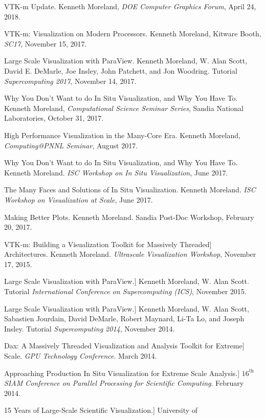 \documentclass{article}
\begin{document}
\begin{enumerate}[label={[\arabic*]}]
\item VTK-m Update.
  Kenneth Moreland, \emph{DOE Computer Graphics Forum}, April 24, 2018.
\item VTK-m: Visualization on Modern Processors.
  Kenneth Moreland, Kitware Booth, \emph{SC17}, November 15, 2017.
\item Large Scale Visualization with ParaView.
  Kenneth Moreland, W. Alan Scott, David E. DeMarle, Joe Insley, John Patchett, and Jon Woodring.
  Tutorial \emph{Supercomputing 2017}, November 14, 2017.
\item Why You Don't Want to do In Situ Visualization, and Why You Have To.
  Kenneth Moreland, \emph{Computational Science Seminar Series}, Sandia National Laboratories, October 31, 2017.
\item High Performance Visualization in the Many-Core Era.
  Kenneth Moreland, \emph{Computing@PNNL Seminar}, August 2017.
\item Why You Don't Want to do In Situ Visualization, and Why You Have To.
  Kenneth Moreland.
  \emph{ISC Workshop on In Situ Visualization}, June 2017.
\item The Many Faces and Solutions of In Situ Visualization.
  Kenneth Moreland.
  \emph{ISC Workshop on Visualization at Scale}, June 2017.
\item Making Better Plots.
  Kenneth Moreland.
  Sandia Post-Doc Workshop, February 20, 2017.
\item VTK-m: Building a Visualization Toolkit for Massively Threaded]~\\ Architectures.
  Kenneth Moreland.
  \emph{Ultrascale Visualization Workshop}, November 17, 2015.
\item Large Scale Visualization with ParaView.] Kenneth Moreland, W.
  Alan Scott. Tutorial \emph{International Conference on Supercomputing
    (ICS)}, November 2015.
\item Large Scale Visualization with ParaView.] Kenneth Moreland, W.
  Alan Scott, Sabastien Jourdain, David DeMarle, Robert Maynard, Li-Ta
  Lo, and Joseph Insley. Tutorial \emph{Supercomputing 2014}, November
  2014.
\item Dax: A Massively Threaded Visualization and Analysis Toolkit for
  Extreme] Scale. \emph{GPU Technology Conference}. March 2014.
\item Approaching Production In Situ Visualization for Extreme Scale
  Analysis.] \emph{$16^{\mathrm{th}}$ SIAM Conference on Parallel
  Processing for Scientific Computing}. February 2014.
\item 15 Years of Large-Scale Scientific Visualization.] University of

\end{enumerate}
\end{document}
